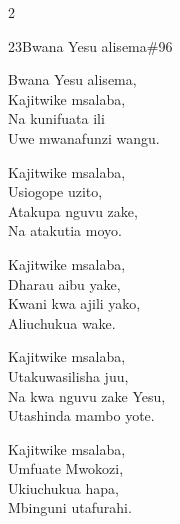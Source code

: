 \begin{multicols}{2}
\begin{hymn}{23}{Bwana Yesu alisema}{\#96}
\begin{stanza}
Bwana Yesu alisema,\\
Kajitwike msalaba,\\
Na kunifuata ili\\
Uwe mwanafunzi wangu.
\end{stanza}
\begin{stanza}
Kajitwike msalaba,\\
Usiogope uzito,\\
Atakupa nguvu zake,\\
Na atakutia moyo.
\end{stanza}
\begin{stanza}
Kajitwike msalaba,\\
Dharau aibu yake,\\
Kwani kwa ajili yako,\\
Aliuchukua wake.
\end{stanza}
\begin{stanza}
Kajitwike msalaba,\\
Utakuwasilisha juu,\\
Na kwa nguvu zake Yesu,\\
Utashinda mambo yote.
\end{stanza}
\begin{stanza}
Kajitwike msalaba,\\
Umfuate Mwokozi,\\
Ukiuchukua hapa,\\
Mbinguni utafurahi.
\end{stanza}
\end{hymn}


\end{multicols}

